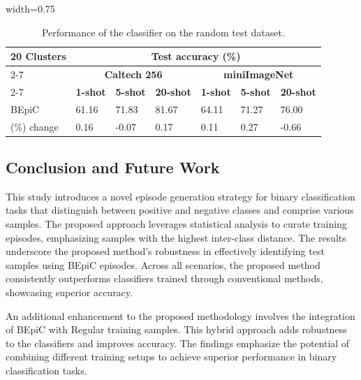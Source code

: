 \begin{table}[!ht]
\centering
\caption{Performance of the classifier on the random test dataset.}
\begin{adjustbox}{width=0.75\columnwidth}
\renewcommand{\arraystretch}{1.5} 
\begin{tabular}{|l|l|l|l|l|l|l|}
 \hline
\multirow{2}{*}{\textbf{20 Clusters} }  & \multicolumn{6}{c|}{\textbf{Test accuracy (\%)}}                             \\
\cline{2-7}
                            & \multicolumn{3}{c|}{\textbf{Caltech 256}} & \multicolumn{3}{c|}{\textbf{miniImageNet}} \\ \cline{2-7}
                            & \textbf{1-shot}   & \textbf{5-shot}   & \textbf{20-shot}   & \textbf{1-shot}   & \textbf{5-shot}   & \textbf{20-shot}   \\ \hline
BEpiC                     & 61.16    & 71.83    & 81.67      & 64.11     & 71.27     & 76.00        \\ \hline
(\%) change               & 0.16    & -0.07    & 0.17      & 0.11    & 0.27     & -0.66    \\ \hline
\end{tabular}
\end{adjustbox}
\label{table:20}
\end{table}

\subsection{Conclusion and Future Work} \label{conclusion}

This study introduces a novel episode generation strategy for binary classification tasks that distinguish between positive and negative classes and comprise various samples. The proposed approach leverages statistical analysis to curate training episodes, emphasizing samples with the highest inter-class distance. The results underscore the proposed method's robustness in effectively identifying test samples using BEpiC episodes. Across all scenarios, the proposed method consistently outperforms classifiers trained through conventional methods, showcasing superior accuracy.

An additional enhancement to the proposed methodology involves the integration of BEpiC with Regular training samples. This hybrid approach adds robustness to the classifiers and improves accuracy. The findings emphasize the potential of combining different training setups to achieve superior performance in binary classification tasks.

